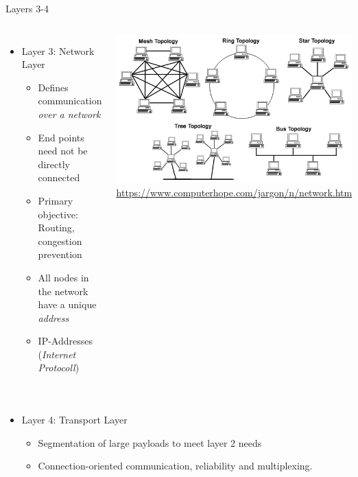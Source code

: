 
\begin{frame}[fragile]{Layers 3-4}
%
\begin{columns}
\vspace{-9pt}
\begin{itemize}
\item Layer 3: Network Layer
	\begin{itemize}
	\item Defines communication \emph{over a network}
	\item End points need not be directly connected
	\item[\Thus] Primary objective: Routing, congestion prevention
	\item All nodes in the network have a unique \emph{address} 
	\item[\Thus] \zB IP-Addresses (\emph{Internet Protocoll}) 
	\end{itemize}
\end{itemize}
%
\includegraphics[width=\linewidth]{./gfx/20-network_topologies}
{\tiny {}
 \url{https://www.computerhope.com/jargon/n/network.htm}\\}
\end{columns}
\pause
%
\vspace{-9pt}
\begin{columns}
\begin{itemize}
\item Layer 4: Transport Layer
	\begin{itemize}
	\item Segmentation of large payloads to meet layer 2 needs
	\item Connection-oriented communication, reliability and multiplexing.

\end{itemize}
\end{itemize}
\end{columns}
\end{frame}
